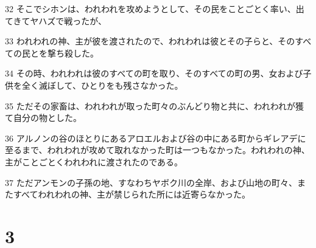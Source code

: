 \par 32 そこでシホンは、われわれを攻めようとして、その民をことごとく率い、出てきてヤハズで戦ったが、
\par 33 われわれの神、主が彼を渡されたので、われわれは彼とその子らと、そのすべての民とを撃ち殺した。
\par 34 その時、われわれは彼のすべての町を取り、そのすべての町の男、女および子供を全く滅ぼして、ひとりをも残さなかった。
\par 35 ただその家畜は、われわれが取った町々のぶんどり物と共に、われわれが獲て自分の物とした。
\par 36 アルノンの谷のほとりにあるアロエルおよび谷の中にある町からギレアデに至るまで、われわれが攻めて取れなかった町は一つもなかった。われわれの神、主がことごとくわれわれに渡されたのである。
\par 37 ただアンモンの子孫の地、すなわちヤボク川の全岸、および山地の町々、またすべてわれわれの神、主が禁じられた所には近寄らなかった。

\chapter{3}

